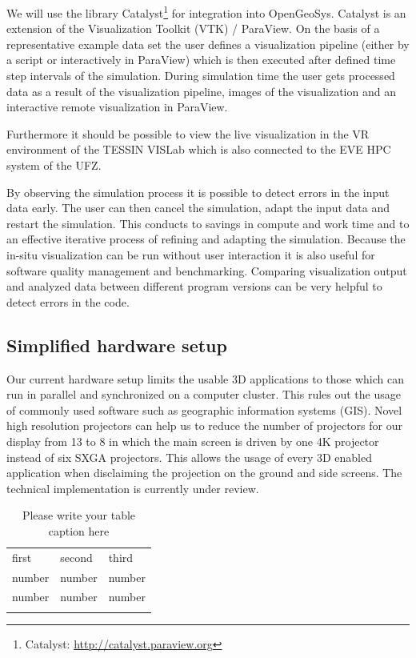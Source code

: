 We will use the library Catalyst\footnote{Catalyst: \url{http://catalyst.paraview.org}} for
integration into OpenGeoSys. Catalyst is an extension of the
Visualization Toolkit (VTK) / ParaView. On the basis of a representative
example data set the user defines a visualization pipeline (either by a
script or interactively in ParaView) which is then executed after
defined time step intervals of the simulation. During simulation time
the user gets processed data as a result of the visualization pipeline,
images of the visualization and an interactive remote visualization in
ParaView.

Furthermore it should be possible to view the live visualization in the
VR environment of the TESSIN VISLab which is also connected to the EVE HPC
system of the UFZ.

By observing the simulation process it is possible to detect errors in
the input data early. The user can then cancel the simulation, adapt the
input data and restart the simulation. This conducts to savings in
compute and work time and to an effective iterative process of refining
and adapting the simulation. Because the in-situ visualization can be
run without user interaction it is also useful for software quality
management and benchmarking. Comparing visualization output and analyzed
data between different program versions can be very helpful to detect
errors in the code.

\subsection{Simplified hardware setup}
\label{simplified-hardware-setup}

Our current hardware setup limits the usable 3D applications to those
which can run in parallel and synchronized on a computer cluster. This
rules out the usage of commonly used software such as geographic
information systems (GIS). Novel high resolution projectors can help us
to reduce the number of projectors for our display from 13 to 8 in which
the main screen is driven by one 4K projector instead of six SXGA
projectors. This allows the usage of every 3D enabled application when
disclaiming the projection on the ground and side screens. The technical
implementation is currently under review.


%
\begin{table}
\caption{Please write your table caption here}
\label{tab:1}       %
\begin{tabular}{lll}
\hline\noalign{\smallskip}
first & second & third  \\
\noalign{\smallskip}\hline\noalign{\smallskip}
number & number & number \\
number & number & number \\
\noalign{\smallskip}\hline
\end{tabular}
\end{table}


